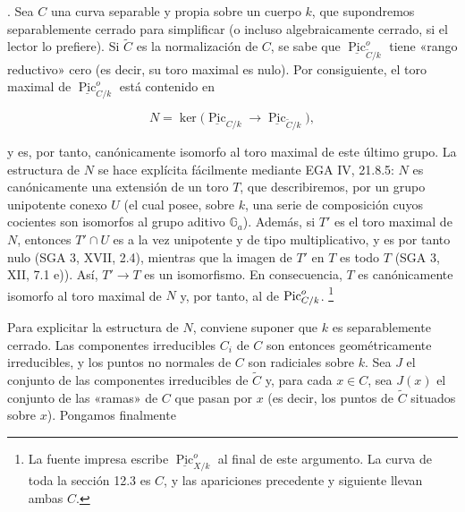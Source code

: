
\medskip
{}. Sea $C$ una curva separable y propia sobre un cuerpo $k$, que
supondremos separablemente cerrado para simplificar (o incluso
algebraicamente cerrado, si el lector lo prefiere). Si $\widetilde C$ es
la normalización de $C$, se sabe que
$\underline{\operatorname{Pic}}^o_{\widetilde C/k}$ tiene «rango
reductivo» cero (es decir, su toro maximal es nulo). Por consiguiente, el
toro maximal de $\underline{\operatorname{Pic}}^o_{C/k}$ está contenido
en

\begin{equation*}
 N=\ker\bigl(\underline{\operatorname{Pic}}_{C/k}
       \longrightarrow\underline{\operatorname{Pic}}_{\widetilde C/k}\bigr),
\end{equation*}

\noindent
y es, por tanto, canónicamente isomorfo al toro maximal de este último
grupo. La estructura de $N$ se hace explícita fácilmente mediante EGA
IV, 21.8.5: $N$ es canónicamente una extensión de un toro $T$, que
describiremos, por un grupo unipotente conexo $U$ (el cual posee, sobre
$k$, una serie de composición cuyos cocientes son isomorfos al grupo
aditivo $\mathbb G_a$). Además, si $T'$ es el toro maximal de $N$,
entonces $T'\cap U$ es a la vez unipotente y de tipo multiplicativo, y es
por tanto nulo (SGA 3, XVII, 2.4), mientras que la imagen de $T'$ en $T$
es todo $T$ (SGA 3, XII, 7.1 e)). Así, $T'\to T$ es un isomorfismo. En
consecuencia, $T$ es canónicamente isomorfo al toro maximal de $N$ y,
por tanto, al de
$\underline{\operatorname{Pic}}^o_{\sisi{X}{C}/k}$.
\footnote{La fuente impresa escribe
$\underline{\operatorname{Pic}}^o_{X/k}$ al final de este argumento. La
curva de toda la sección 12.3 es $C$, y las apariciones precedente y
siguiente llevan ambas $C$.}


Para explicitar la estructura de $N$, conviene suponer que $k$ es
separablemente cerrado. Las componentes irreducibles $C_i$ de $C$ son
entonces geométricamente irreducibles, y los puntos no normales de $C$
son radiciales sobre $k$. Sea $J$ el conjunto de las componentes
irreducibles de $\widetilde C$ y, para cada $x\in C$, sea $J(x)$ el
conjunto de las «ramas» de $C$ que pasan por $x$ (es decir, los puntos de
$\widetilde C$ situados sobre $x$). Pongamos finalmente

